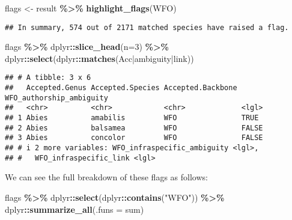 \documentclass[
  11pt,
]{article}
\newenvironment{Shaded}{\begin{snugshade}}{\end{snugshade}}
\newcommand{\AttributeTok}[1]{\textcolor[rgb]{0.13,0.29,0.53}{#1}}
\newcommand{\DecValTok}[1]{\textcolor[rgb]{0.00,0.00,0.81}{#1}}
\newcommand{\FunctionTok}[1]{\textcolor[rgb]{0.13,0.29,0.53}{\textbf{#1}}}
\newcommand{\NormalTok}[1]{#1}
\newcommand{\OtherTok}[1]{\textcolor[rgb]{0.56,0.35,0.01}{#1}}
\newcommand{\SpecialCharTok}[1]{\textcolor[rgb]{0.81,0.36,0.00}{\textbf{#1}}}
\newcommand{\StringTok}[1]{\textcolor[rgb]{0.31,0.60,0.02}{#1}}
\begin{document}
\begin{Shaded}
\begin{Highlighting}[]
\NormalTok{flags }\OtherTok{\textless{}{-}}\NormalTok{ result }\SpecialCharTok{\%\textgreater{}\%} \FunctionTok{highlight\_flags}\NormalTok{(}\StringTok{\textquotesingle{}WFO\textquotesingle{}}\NormalTok{)}
\end{Highlighting}
\end{Shaded}

\begin{verbatim}
## In summary, 574 out of 2171 matched species have raised a flag.
\end{verbatim}

\begin{Shaded}
\begin{Highlighting}[]
\NormalTok{flags }\SpecialCharTok{\%\textgreater{}\%} 
\NormalTok{  dplyr}\SpecialCharTok{::}\FunctionTok{slice\_head}\NormalTok{(}\AttributeTok{n=}\DecValTok{3}\NormalTok{) }\SpecialCharTok{\%\textgreater{}\%} 
\NormalTok{  dplyr}\SpecialCharTok{::}\FunctionTok{select}\NormalTok{(dplyr}\SpecialCharTok{::}\FunctionTok{matches}\NormalTok{(}\StringTok{\textquotesingle{}Acc|ambiguity|link\textquotesingle{}}\NormalTok{))}
\end{Highlighting}
\end{Shaded}

\begin{verbatim}
## # A tibble: 3 x 6
##   Accepted.Genus Accepted.Species Accepted.Backbone WFO_authorship_ambiguity
##   <chr>          <chr>            <chr>             <lgl>                   
## 1 Abies          amabilis         WFO               TRUE                    
## 2 Abies          balsamea         WFO               FALSE                   
## 3 Abies          concolor         WFO               FALSE                   
## # i 2 more variables: WFO_infraspecific_ambiguity <lgl>,
## #   WFO_infraspecific_link <lgl>
\end{verbatim}

We can see the full breakdown of these flags as follows:

\begin{Shaded}
\begin{Highlighting}[]
\NormalTok{flags }\SpecialCharTok{\%\textgreater{}\%}\NormalTok{ dplyr}\SpecialCharTok{::}\FunctionTok{select}\NormalTok{(dplyr}\SpecialCharTok{::}\FunctionTok{contains}\NormalTok{(}\StringTok{"WFO"}\NormalTok{)) }\SpecialCharTok{\%\textgreater{}\%}\NormalTok{ dplyr}\SpecialCharTok{::}\FunctionTok{summarize\_all}\NormalTok{(}\AttributeTok{.funs =}\NormalTok{ sum)}
\end{Highlighting}
\end{Shaded}
\end{document}
